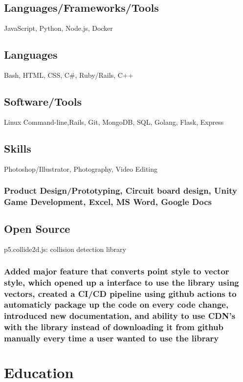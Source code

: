 \documentclass{article}
\begin{document}
		\subsection{Languages/Frameworks/Tools}
		JavaScript, Python, Node.js, Docker
		\subsection{Languages}
		Bash, HTML, CSS,  C\#, Ruby/Rails, C++
		\vspace{-2mm}
		
		\subsection{Software/Tools}
		Linux Command-line,Rails, Git, MongoDB, SQL, Golang, Flask, Express
		\vspace{-3mm}
		\subsection{Skills}Photoshop/Illustrator, Photography, Video Editing
		\vspace{-3mm}
		\subsubsection{Product Design/Prototyping, Circuit board design,  Unity Game Development, Excel, MS Word, Google Docs}
		\vspace{-3mm}

    	\subsection{Open Source} p5.collide2d.js: collision detection library
		\subsubsection{Added major feature that converts point style to vector style, which opened up a interface to use the library using vectors, created a CI/CD pipeline using github actions to automaticly package up the code on every code change, introduced new documentation, and ability to use CDN's with the library instead of downloading it from github manually every time a user wanted to use the library }
		\vspace{-3mm}
			
    		    		
	\section{Education}
\end{document}
